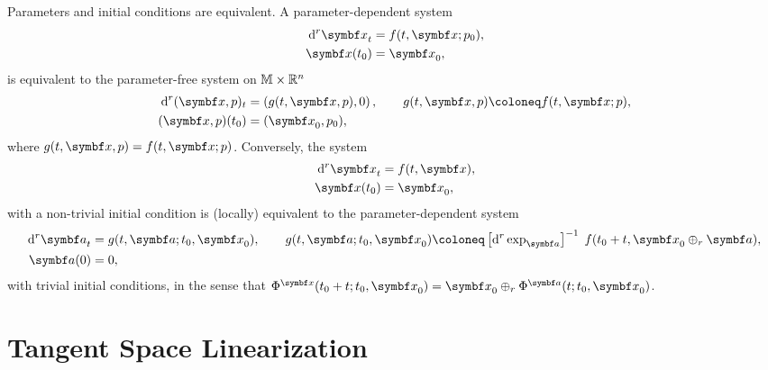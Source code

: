 \begin{remark}
  \label{remark:parameter_initial}
  Parameters and initial conditions are equivalent. A parameter-dependent system
  \begin{equation}
    \begin{aligned}
      \mathrm{d}^r \x_t & = f(t, \x; p_{0}), \\
      \x(t_{0})         & = \x_{0},
    \end{aligned}
  \end{equation}
  is equivalent to the parameter-free system on $\mathbb{M} \times \mathbb{R}^{n}$
  \begin{equation}
    \begin{aligned}
      \mathrm{d}^r (\x, p)_t & =  \left(g(t, \x, p), 0\right), \qquad g(t, \x, p) \coloneq f(t, \x; p), \\
      (\x, p)(t_{0})         & = (\x_0, p_{0}),
    \end{aligned}
  \end{equation}
  where $g(t, \x, p) = f(t, \x; p)$. Conversely, the system
  \begin{equation}
    \begin{aligned}
      \mathrm{d}^{r} \x_{t} & = f(t, \x), \\
      \x(t_{0})             & = \x_{0},
    \end{aligned}
  \end{equation}
  with a non-trivial initial condition is (locally) equivalent to the parameter-dependent system
  \begin{equation}
    \begin{aligned}
      \mathrm{d}^{r} \a_{t} & = g(t, \a; t_{0}, \x_{0}), \qquad g(t, \a; t_{0}, \x_{0}) \coloneq \left[ \mathrm{d}^{r} \exp_{\a} \right]^{-1} \; f(t_{0} + t, \x_{0} \oplus_{r} \a), \\
      \a(0)                 & = 0,
    \end{aligned}
  \end{equation}
  with trivial initial conditions, in the sense that $\Phi^{\x}(t_{0} + t; t_{0}, \x_{0}) = \x_{0} \oplus_{r} \Phi^{\a}(t; t_{0}, \x_{0})$.
\end{remark}


\section{Tangent Space Linearization}

